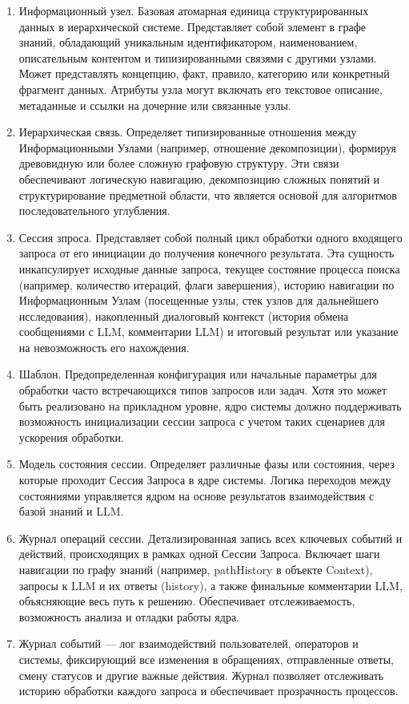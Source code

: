 \begin{enumerate}[label=\arabic*.]
    \item Информационный узел. Базовая атомарная единица структурированных данных в иерархической системе. Представляет собой элемент в графе знаний, обладающий уникальным идентификатором, наименованием, описательным контентом и типизированными связями с другими узлами. Может представлять концепцию, факт, правило, категорию или конкретный фрагмент данных. Атрибуты узла могут включать его текстовое описание, метаданные и ссылки на дочерние или связанные узлы.

    \item Иерархическая связь. Определяет типизированные отношения между Информационными Узлами (например, отношение декомпозиции), формируя древовидную или более сложную графовую структуру. Эти связи обеспечивают логическую навигацию, декомпозицию сложных понятий и структурирование предметной области, что является основой для алгоритмов последовательного углубления.

    \item Сессия зпроса. Представляет собой полный цикл обработки одного входящего запроса от его инициации до получения конечного результата. Эта сущность инкапсулирует исходные данные запроса, текущее состояние процесса поиска (например, количество итераций, флаги завершения), историю навигации по Информационным Узлам (посещенные узлы, стек узлов для дальнейшего исследования), накопленный диалоговый контекст (история обмена сообщениями с LLM, комментарии LLM) и итоговый результат или указание на невозможность его нахождения.
    
    \item Шаблон. Предопределенная конфигурация или начальные параметры для обработки часто встречающихся типов запросов или задач. Хотя это может быть реализовано на прикладном уровне, ядро системы должно поддерживать возможность инициализации сессии запроса с учетом таких сценариев для ускорения обработки.
    
    \item Модель состояния сессии. Определяет различные фазы или состояния, через которые проходит Сессия Запроса в ядре системы. Логика переходов между состояниями управляется ядром на основе результатов взаимодействия с базой знаний и LLM.
    
    \item Журнал операций сессии. Детализированная запись всех ключевых событий и действий, происходящих в рамках одной Сессии Запроса. Включает шаги навигации по графу знаний (например, pathHistory в объекте Context), запросы к LLM и их ответы (history), а также финальные комментарии LLM, объясняющие весь путь к решению. Обеспечивает отслеживаемость, возможность анализа и отладки работы ядра.
    
    \item Журнал событий — лог взаимодействий пользователей, операторов и системы, фиксирующий все изменения в обращениях, отправленные ответы, смену статусов и другие важные действия. Журнал позволяет отслеживать историю обработки каждого запроса и обеспечивает прозрачность процессов.
    
\end{enumerate}

